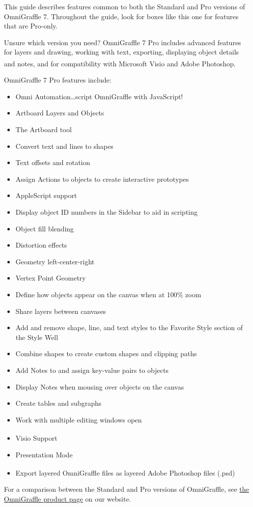 \documentclass[../main.tex]{subfiles}
\begin{document}
\begin{ogpro}
  This guide describes features common to both the Standard and Pro versions of OmniGraffle 7.
  Throughout the guide, look for boxes like this one for features that are Pro-only.

  Unsure which version you need? OmniGraffle 7 Pro includes advanced features for layers and
  drawing, working with text, exporting, displaying object details and notes, and for
  compatibility with Microsoft Visio\textsuperscript{\textregistered{}} and Adobe
  Photoshop\textsuperscript{\textregistered{}}.

  OmniGraffle 7 Pro features include:

  \begin{itemize}
    \item Omni Automation\ldots{}script OmniGraffle with JavaScript!
    \item Artboard Layers and Objects
    \item The Artboard tool
    \item Convert text and lines to shapes
    \item Text offsets and rotation
    \item Assign Actions to objects to create interactive prototypes
    \item AppleScript support
    \item Display object ID numbers in the Sidebar to aid in scripting
    \item Object fill blending
    \item Distortion effects
    \item Geometry left-center-right
    \item Vertex Point Geometry
    \item Define how objects appear on the canvas when at 100\% zoom
    \item Share layers between canvases
    \item Add and remove shape, line, and text styles to the Favorite Style section of the Style
      Well
    \item Combine shapes to create custom shapes and clipping paths
    \item Add Notes to and assign key-value pairs to objects
    \item Display Notes when mousing over objects on the canvas
    \item Create tables and subgraphs
    \item Work with multiple editing windows open
    \item Visio\textsuperscript{\textregistered{}} Support
    \item Presentation Mode
    \item Export layered OmniGraffle files as layered Adobe\textsuperscript{\textregistered{}}
      Photoshop\textsuperscript{\textregistered{}} files (.psd)
  \end{itemize}

  For a comparison between the Standard and Pro versions of OmniGraffle, see
  \href{https://www.omnigroup.com/omnigraffle\#pro}{the OmniGraffle product page} on our
  website.
\end{ogpro}
\end{document}

